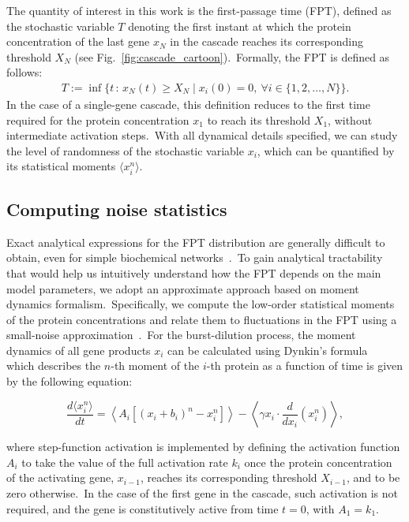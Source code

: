 \documentclass[aps,prb,reprint,superscriptaddress]{revtex4-2}
\begin{document}
The quantity of interest in this work is the first-passage time (FPT), defined as the stochastic variable $T$ denoting the first instant at which the protein concentration of the last gene $x_N$ in the cascade reaches its corresponding threshold $X_N$ (see Fig.~\ref{fig:cascade_cartoon}).~Formally, the FPT is defined as follows:
{\small
\begin{align}
    T := \inf\{t \,:\, x_N(t) \geq X_N \mid x_i(0)=0,\ \forall i \in \{1,2,\ldots,N\}\}.
\end{align}}
In the case of a single-gene cascade, this definition reduces to the first time required for the protein concentration \(x_1\) to reach its threshold \(X_1\), without intermediate activation steps.~With all dynamical details specified, we can study the level of randomness of the stochastic variable $x_i$, which can be quantified by its statistical moments $\langle x_i^n \rangle$.~

\subsection*{Computing noise statistics}

Exact analytical expressions for the FPT distribution are generally difficult to obtain, even for simple biochemical networks~\cite{Rao_Waxman_Lin_Song_2025}.~To gain analytical tractability that would help us intuitively understand how the FPT depends on the main model parameters, we adopt an approximate approach based on moment dynamics formalism.~Specifically, we compute the low-order statistical moments of the protein concentrations and relate them to fluctuations in the FPT using a small-noise approximation~\cite{co2017stochastic}.~For the burst-dilution process, the moment dynamics of all gene products $x_i$ can be calculated using Dynkin's formula~\cite{singh2010stochastic} which describes the $n$-th moment of the $i$-th protein as a function of time is given by the following equation:

\begin{equation}\label{eq:moment_dynamics}
\frac{d\langle x_i^n \rangle}{dt} = \left\langle  A_i \left[(x_i + b_i)^n - x_i^n\right] \right\rangle 
- \left\langle \gamma x_i \cdot \frac{d}{dx_i}\left(x_i^n\right) \right\rangle,
\end{equation}

where step-function activation is implemented by defining the activation function \(A_i\) to take the value of the full activation rate \(k_i\) once the protein concentration of the activating gene, \(x_{i-1}\), reaches its corresponding threshold \(X_{i-1}\), and to be zero otherwise.~In the case of the first gene in the cascade, such activation is not required, and the gene is constitutively active from time \(t=0\), with \(A_1 = k_1\).
\end{document}
